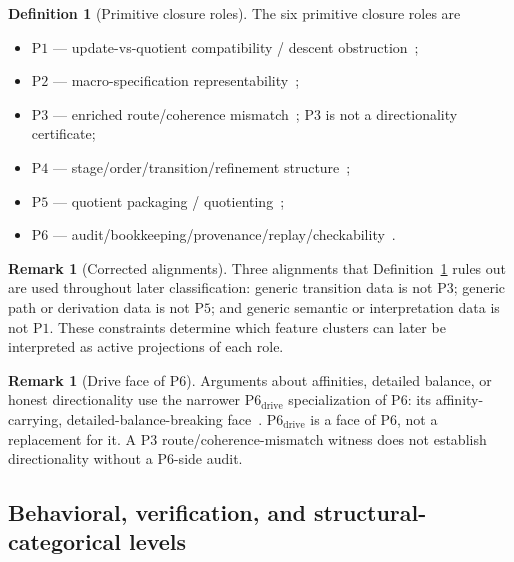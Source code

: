 \documentclass[11pt]{article}
\theoremstyle{definition}
\newtheorem{definition}[theorem]{Definition}
\newtheorem{remark}[theorem]{Remark}
\newcommand{\Pone}{\ensuremath{\mathrm{P1}}}
\newcommand{\Ptwo}{\ensuremath{\mathrm{P2}}}
\newcommand{\Pthree}{\ensuremath{\mathrm{P3}}}
\newcommand{\Pfour}{\ensuremath{\mathrm{P4}}}
\newcommand{\Pfive}{\ensuremath{\mathrm{P5}}}
\newcommand{\Psix}{\ensuremath{\mathrm{P6}}}
\begin{document}
\begin{definition}[Primitive closure roles]\label{def:primitive-roles}
The six primitive closure roles are
\begin{itemize}[topsep=2pt,itemsep=1pt]
  \item \Pone{} --- update-vs-quotient compatibility / descent
    obstruction~\citep{GrothendieckSGA1,JanelidzeTholen1994};
  \item \Ptwo{} --- macro-specification
    representability~\citep{MacLane1998};
  \item \Pthree{} --- enriched route/coherence
    mismatch~\citep{BaaderNipkow1998,Nakahara2003}; \Pthree{} is not a
    directionality certificate;
  \item \Pfour{} --- stage/order/transition/refinement
    structure~\citep{Milner1989,BackVonWright1998};
  \item \Pfive{} --- quotient packaging /
    quotienting~\citep{KemenySnell1960};
  \item \Psix{} --- audit/bookkeeping/provenance/replay/checkability~\citep{GreenKarvounarakisTannen2007,Merkle1987}.
\end{itemize}
\end{definition}

\begin{remark}[Corrected alignments]\label{rem:repaired-alignments}
Three alignments that Definition~\ref{def:primitive-roles} rules out
are used throughout later classification: generic transition data is
not \Pthree{}; generic path or derivation data is not \Pfive{}; and
generic semantic or interpretation data is not \Pone{}. These
constraints determine which feature clusters can later be interpreted
as active projections of each role.
\end{remark}

\begin{remark}[Drive face of \Psix{}]\label{rem:p6-drive}
Arguments about affinities, detailed balance, or honest directionality
use the narrower \(\mathrm{P6}_{\mathrm{drive}}\) specialization of
\Psix{}: its affinity-carrying, detailed-balance-breaking
face~\citep{Seifert2012}. \(\mathrm{P6}_{\mathrm{drive}}\) is a face
of \Psix{}, not a replacement for it. A \Pthree{}
route/coherence-mismatch witness does not establish directionality
without a \Psix{}-side audit.
\end{remark}

\subsection{Behavioral, verification, and structural-categorical levels}\label{subsec:levels}
\end{document}
